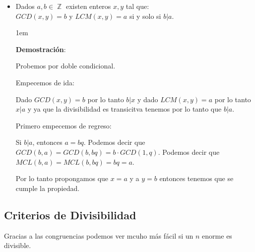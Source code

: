 \documentclass[12pt, fleqn]{report}                             %
\newenvironment{SmallIndentation}[1][0.75em]                    %
    {\begin{adjustwidth}{#1}{}\begin{footnotesize}}                 %
    {\end{footnotesize}\end{adjustwidth}}                           %
\DeclareMathOperator \Integers  {\mathbb{Z}}                     %
\begin{document}
\begin{itemize}
\begin{SmallIndentation}[1em]
                        Y bingo, demostrado ;)

                    \end{SmallIndentation}


                \item Dados $a, b \in \Integers$ existen enteros $x, y$ tal que:\\
                    $GCD(x, y) = b$  y $LCM(x, y) = a$ si y solo si $b|a$.

                    \begin{SmallIndentation}[1em]
                        \textbf{Demostración}:

                        Probemos por doble condicional.

                        Empecemos de ida:
                        
                        Dado $GCD(x, y) = b$ por lo tanto $b|x$ y dado $LCM(x, y) = a$ por lo tanto $x|a$
                        y ya que la divisibilidad es transicitva tenemos por lo tanto que $b|a$.


                        Primero empecemos de regreso:

                        Si $b|a$, entonces $a = bq$.
                        Podemos decir que $GCD(b, a) = GCD(b, bq) = b \cdot GCD(1, q)$.
                        Podemos decir que $MCL(b, a) = MCL(b, bq) = bq = a$.

                        Por lo tanto propongamos que $x=a$ y a $y=b$ entonces tenemos que 
                        se cumple la propiedad.

                    \end{SmallIndentation}



            \end{itemize}



        \clearpage
        \subsection{Criterios de Divisibilidad}

            Gracias a las congruencias podemos ver mcuho más fácil si un $n$ enorme
            es divisible.
\end{document}

